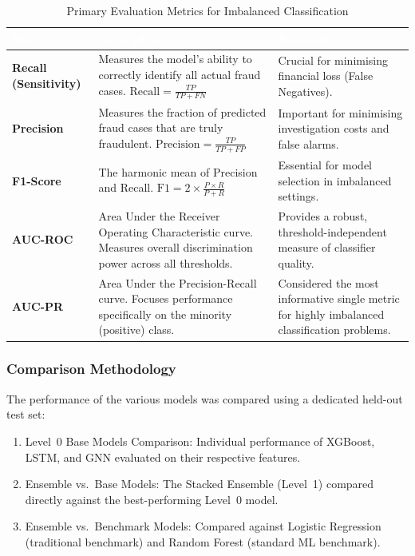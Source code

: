 \documentclass[12pt,a4paper,oneside]{report}
\numberwithin{equation}{chapter}
\renewcommand{\arraystretch}{1.6}
\begin{document}
\begin{table}[H]
\centering
\caption{Primary Evaluation Metrics for Imbalanced Classification}
\label{tab:evaluation_metrics}
\renewcommand{\arraystretch}{1.4}
\begin{tabular}{L{2.8cm} L{5cm} L{5.5cm}}
\toprule
{}
\textcolor{white}{\textbf{Metric}} &
\textcolor{white}{\textbf{Description}} &
\textcolor{white}{\textbf{Rationale}} \\
\midrule
{}
\textbf{Recall (Sensitivity)} &
Measures the model's ability to correctly identify all actual fraud cases.
$\text{Recall} = \frac{TP}{TP + FN}$ &
Crucial for minimising financial loss (False Negatives). \\
\textbf{Precision} &
Measures the fraction of predicted fraud cases that are truly fraudulent.
$\text{Precision} = \frac{TP}{TP + FP}$ &
Important for minimising investigation costs and false alarms. \\
\textbf{F1-Score} &
The harmonic mean of Precision and Recall.
$\text{F1} = 2 \times \frac{P \times R}{P + R}$ &
Essential for model selection in imbalanced settings. \\
\textbf{AUC-ROC} &
Area Under the Receiver Operating Characteristic curve. Measures overall discrimination power across all thresholds. &
Provides a robust, threshold-independent measure of classifier quality. \\
\textbf{AUC-PR} &
Area Under the Precision-Recall curve. Focuses performance specifically on the minority (positive) class. &
Considered the most informative single metric for highly imbalanced classification problems. \\
\bottomrule
\end{tabular}
\end{table}

\subsubsection{Comparison Methodology}
\label{sec:comparison-methodology}

The performance of the various models was compared using a dedicated held-out test set:
\begin{enumerate}
    \item Level~0 Base Models Comparison: Individual performance of XGBoost, LSTM, and GNN evaluated on their respective features.
    \item Ensemble vs.\ Base Models: The Stacked Ensemble (Level~1) compared directly against the best-performing Level~0 model.
    \item Ensemble vs.\ Benchmark Models: Compared against Logistic Regression (traditional benchmark) and Random Forest (standard ML benchmark).
\end{enumerate}
\end{document}
